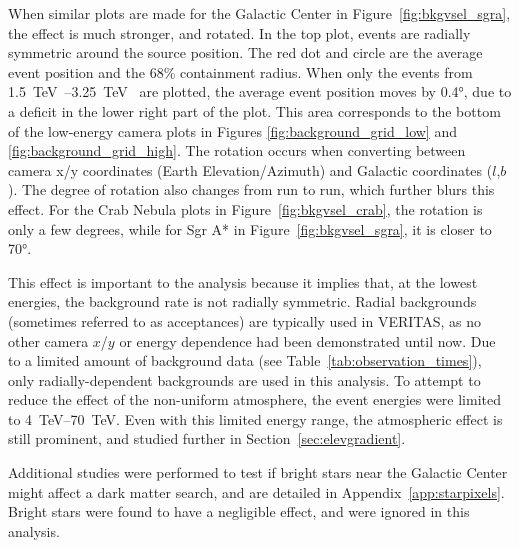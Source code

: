 When similar plots are made for the Galactic Center in Figure~\ref{fig:bkgvsel_sgra}, the effect is much stronger, and rotated.
In the top plot, events are radially symmetric around the source position.
The red dot and circle are the average event position and the 68\% containment radius.
When only the events from \SIrange{1.5}{3.25}{\TeV{}} are plotted, the average event position moves by \ang{0.4}, due to a deficit in the lower right part of the plot.
This area corresponds to the bottom of the low-energy camera plots in Figures \ref{fig:background_grid_low} and \ref{fig:background_grid_high}.
The rotation occurs when converting between camera x/y coordinates (Earth Elevation/Azimuth) and Galactic coordinates ($l$,$b$).
The degree of rotation also changes from run to run, which further blurs this effect.
For the Crab Nebula plots in Figure~\ref{fig:bkgvsel_crab}, the rotation is only a few degrees, while for Sgr A* in Figure~\ref{fig:bkgvsel_sgra}, it is closer to \ang{70}.
    
This effect is important to the analysis because it implies that, at the lowest energies, the background rate is not radially symmetric.
Radial backgrounds (sometimes referred to as acceptances) are typically used in VERITAS, as no other camera $x$/$y$ or energy dependence had been demonstrated until now.
Due to a limited amount of background data (see Table~\ref{tab:observation_times}), only radially-dependent backgrounds are used in this analysis.
To attempt to reduce the effect of the non-uniform atmosphere, the event energies were limited to \SIrange{4}{70}{TeV}.
Even with this limited energy range, the atmospheric effect is still prominent, and studied further in Section~\ref{sec:elevgradient}.

Additional studies were performed to test if bright stars near the Galactic Center might affect a dark matter search, and are detailed in Appendix~\ref{app:starpixels}.
Bright stars were found to have a negligible effect, and were ignored in this analysis.

\FloatBarrier


